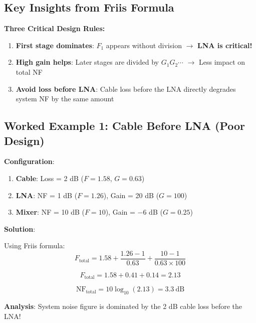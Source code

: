\subsection{Key Insights from Friis Formula}

\begin{warningbox}
\textbf{Three Critical Design Rules:}

\begin{enumerate}
\item \textbf{First stage dominates}: $F_1$ appears without division $\rightarrow$ \textbf{LNA is critical!}
\item \textbf{High gain helps}: Later stages are divided by $G_1 G_2 \cdots$ $\rightarrow$ Less impact on total NF
\item \textbf{Avoid loss before LNA}: Cable loss before the LNA directly degrades system NF by the same amount
\end{enumerate}
\end{warningbox}

\subsection{Worked Example 1: Cable Before LNA (Poor Design)}

\textbf{Configuration}:
\begin{enumerate}
\item \textbf{Cable}: Loss = 2 dB ($F = 1.58$, $G = 0.63$)
\item \textbf{LNA}: NF = 1 dB ($F = 1.26$), Gain = 20 dB ($G = 100$)
\item \textbf{Mixer}: NF = 10 dB ($F = 10$), Gain = $-6$ dB ($G = 0.25$)
\end{enumerate}

\textbf{Solution}:

Using Friis formula:
\begin{equation}
F_{\text{total}} = 1.58 + \frac{1.26 - 1}{0.63} + \frac{10 - 1}{0.63 \times 100}
\end{equation}

\begin{equation}
F_{\text{total}} = 1.58 + 0.41 + 0.14 = 2.13
\end{equation}

\begin{equation}
\text{NF}_{\text{total}} = 10\log_{10}(2.13) = 3.3~\text{dB}
\end{equation}

\textbf{Analysis}: System noise figure is dominated by the 2 dB cable loss before the LNA!

